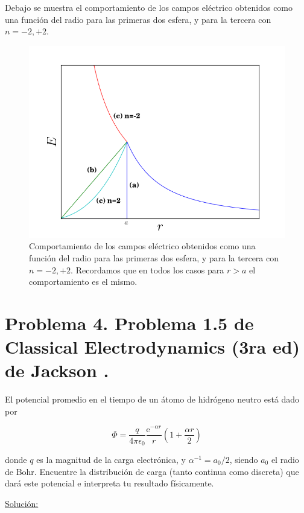 \documentclass[a4paper,10pt]{article}
\numberwithin{equation}{section}
\newcommand{\euler}{\mathrm{e}}
\begin{document}
Debajo se muestra el comportamiento de los campos eléctrico obtenidos como 
una función del radio para las primeras dos esfera, y para la tercera 
con $n= -2,+2$. 

\begin{figure}[H]
 \center 
\includegraphics[scale=0.44]{problema3fig1}
 \caption{Comportamiento de los campos eléctrico obtenidos como 
una función del radio para las primeras dos esfera, y para la tercera 
con $n= -2,+2$. Recordamos que en todos los casos para $r>a$ el comportamiento 
es el mismo.}
 \label{fig:problema3fig1}
\end{figure}

\section{Problema 4. Problema 1.5 de Classical Electrodynamics (3ra ed) de 
Jackson \cite{jackson}.}

El potencial promedio en el tiempo de un átomo de hidrógeno neutro está dado por 

$$
\Phi = \frac{q}{4\pi\epsilon_0}\frac{\euler^{-\alpha r}}{r}\left(1 + 
\frac{\alpha r}{2}\right)
$$

donde $q$ es la magnitud de la carga electrónica, y $\alpha^{-1} = a_0/2$, siendo 
$a_0$ el radio de Bohr. Encuentre la distribución de carga (tanto continua como 
discreta) que dará este potencial e interpreta tu resultado físicamente.

\vspace{.3cm}

\underline{Solución:} \vspace{.3cm}
\end{document}
